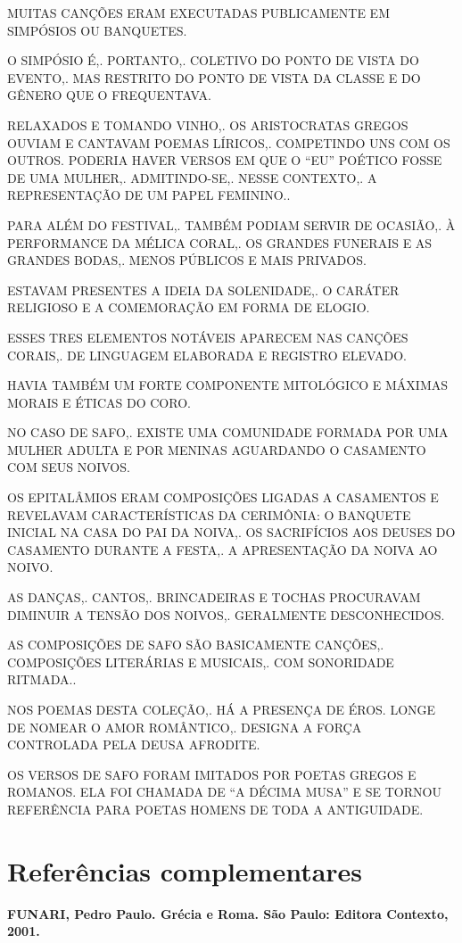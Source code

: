 \documentclass[12pt]{extarticle}
\begin{document}
MUITAS CANÇÕES ERAM EXECUTADAS PUBLICAMENTE EM SIMPÓSIOS OU BANQUETES.


O SIMPÓSIO É,. PORTANTO,. COLETIVO DO PONTO DE VISTA DO EVENTO,. MAS
RESTRITO DO PONTO DE VISTA DA CLASSE E DO GÊNERO QUE O FREQUENTAVA.


RELAXADOS E TOMANDO VINHO,. OS ARISTOCRATAS GREGOS OUVIAM E CANTAVAM
POEMAS LÍRICOS,. COMPETINDO UNS COM OS OUTROS. PODERIA HAVER VERSOS EM
QUE O ``EU'' POÉTICO FOSSE DE UMA MULHER,. ADMITINDO-SE,. NESSE
CONTEXTO,. A REPRESENTAÇÃO DE UM PAPEL FEMININO..

PARA ALÉM DO FESTIVAL,. TAMBÉM PODIAM SERVIR DE OCASIÃO,. À PERFORMANCE
DA MÉLICA CORAL,. OS GRANDES FUNERAIS E AS GRANDES BODAS,. MENOS
PÚBLICOS E MAIS PRIVADOS.


ESTAVAM PRESENTES A IDEIA DA SOLENIDADE,. O CARÁTER RELIGIOSO E A
COMEMORAÇÃO EM FORMA DE ELOGIO.


ESSES TRES ELEMENTOS NOTÁVEIS APARECEM NAS CANÇÕES CORAIS,. DE LINGUAGEM
ELABORADA E REGISTRO ELEVADO.


HAVIA TAMBÉM UM FORTE COMPONENTE MITOLÓGICO E MÁXIMAS MORAIS E ÉTICAS DO
CORO.


NO CASO DE SAFO,. EXISTE UMA COMUNIDADE FORMADA POR UMA MULHER ADULTA E
POR MENINAS AGUARDANDO O CASAMENTO COM SEUS NOIVOS.


OS EPITALÂMIOS ERAM COMPOSIÇÕES LIGADAS A CASAMENTOS E REVELAVAM
CARACTERÍSTICAS DA CERIMÔNIA: O BANQUETE INICIAL NA CASA DO PAI DA
NOIVA,. OS SACRIFÍCIOS AOS DEUSES DO CASAMENTO DURANTE A FESTA,. A
APRESENTAÇÃO DA NOIVA AO NOIVO.


AS DANÇAS,. CANTOS,. BRINCADEIRAS E TOCHAS PROCURAVAM DIMINUIR A TENSÃO
DOS NOIVOS,. GERALMENTE DESCONHECIDOS.

AS COMPOSIÇÕES DE SAFO SÃO BASICAMENTE CANÇÕES,. COMPOSIÇÕES LITERÁRIAS
E MUSICAIS,. COM SONORIDADE RITMADA..


NOS POEMAS DESTA COLEÇÃO,. HÁ A PRESENÇA DE ÉROS. LONGE DE NOMEAR O AMOR
ROMÂNTICO,. DESIGNA A FORÇA CONTROLADA PELA DEUSA AFRODITE.


OS VERSOS DE SAFO FORAM IMITADOS POR POETAS GREGOS E ROMANOS. ELA FOI
CHAMADA DE ``A DÉCIMA MUSA'' E SE TORNOU REFERÊNCIA PARA POETAS HOMENS
DE TODA A ANTIGUIDADE.


\section{Referências complementares}

\textbf{FUNARI, Pedro Paulo. Grécia e Roma. São Paulo: Editora Contexto,
2001.}
\end{document}
